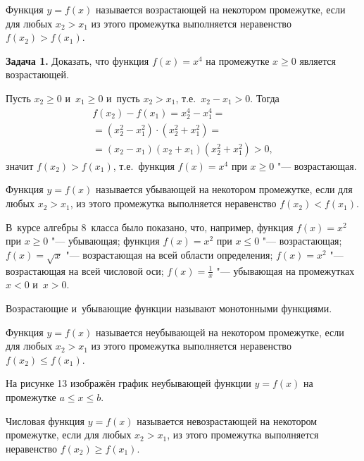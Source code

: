 \begin{Def}
Функция $y = f(x)$ называется возрастающей на некотором промежутке,
если для любых $x_{2} > x_{1}$ из этого промежутка выполняется
неравенство $f(x_{2}) > f(x_{1})$.
\end{Def}

\textbf{Задача 1.}
Доказать, что функция $f(x) = x^{4}$ на промежутке $x \geqslant 0$
является возрастающей.

Пусть $x_{2} \geqslant 0$ и~$x_{1} \geqslant 0$ и~пусть $x_{2} > x_{1}$,
т.е.\ $x_{2} - x_{1} > 0$.
Тогда
\begin{multline*}
f(x_{2}) - f(x_{1}) = x_{2}^{4} - x_{1}^{4} = \\
=(x_{2}^{2} - x_{1}^{2}) \cdot (x_{2}^{2} + x_{1}^{2}) = \\
= (x_{2} - x_{1})(x_{2} + x_{1})(x_{2}^{2} + x_{1}^{2}) > 0,
\end{multline*}
значит $f(x_{2}) > f(x_{1})$, т.е.\ функция $f(x) = x^{4}$
при $x \geqslant 0$ "--- возрастающая.

\begin{Def}
Функция $y = f(x)$ называется убывающей на некотором промежутке,
если для любых $x_{2} > x_{1}$, из этого промежутка выполняется неравенство
$f(x_{2}) < f(x_{1})$.
\end{Def}

В~курсе алгебры 8~класса было показано, что, например,
функция $f(x) = x^{2}$ при $x \geqslant 0$ "--- убывающая;
функция $f(x) = x^{2}$ при $x \leqslant 0$ "--- возрастающая;
$f(x) = \sqrt{x}$ "--- возрастающая на всей области определения;
$f(x) = x^{2}$ "--- возрастающая на всей числовой оси;
$\displaystyle f(x) = \frac{1}{x}$ "--- убывающая на промежутках $x<0$ и~$x>0$.

Возрастающие и~убывающие функции называют монотонными функциями.

\begin{Def}
Функция $y = f(x)$ называется неубывающей на некотором промежутке,
если для любых $x_{2} > x_{1}$ из этого промежутка выполняется
неравенство $f(x_{2}) \leqslant f(x_{1})$.
\end{Def}

На рисунке 13 изображён график неубывающей функции $y = f(x)$
на промежутке $a \leqslant x \leqslant b$.

\begin{Def}
Числовая функция $y = f(x)$ называется невозрастающей на некотором
промежутке, если для любых $x_{2} > x_{1}$, из этого промежутка
выполняется неравенство $f(x_{2}) \geqslant f(x_{1})$.
\end{Def}

